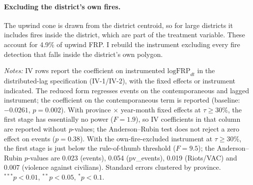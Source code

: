 \documentclass[12pt]{article}
\begin{document}
\paragraph{Excluding the district's own fires.} The upwind cone is drawn from the district centroid, so for large districts it includes fires inside the district, which are part of the treatment variable. These account for 4.9\% of upwind FRP. I rebuild the instrument excluding every fire detection that falls inside the district's own polygon.

\begin{table}[H]
\centering
\caption{Regional shocks and own-district fires}
\label{tab:regional}
\begin{minipage}{0.95\textwidth}
\vspace{4pt}
\footnotesize \emph{Notes:} IV rows report the coefficient on instrumented $\text{logFRP}_{dt}$ in the distributed-lag specification (IV-1/IV-2), with the fixed effects or instrument indicated. The reduced form regresses events on the contemporaneous and lagged instrument; the coefficient on the contemporaneous term is reported (baseline: $-0.0261$, $p=0.002$). With province $\times$ year-month fixed effects at $\tau \geq 30\%$, the first stage has essentially no power ($F = 1.9$), so IV coefficients in that column are reported without $p$-values; the Anderson--Rubin test does not reject a zero effect on events ($p=0.38$). With the own-fire-excluded instrument at $\tau \geq 30\%$, the first stage is just below the rule-of-thumb threshold ($F = 9.5$); the Anderson--Rubin $p$-values are 0.023 (events), 0.054 (pv\_events), 0.019 (Riots/VAC) and 0.007 (violence against civilians). Standard errors clustered by province. $^{***}p<0.01$, $^{**}p<0.05$, $^{*}p<0.1$.
\end{minipage}
\end{table}
\end{document}
